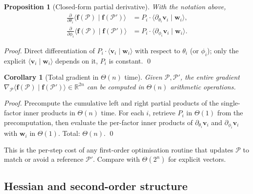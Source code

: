 \documentclass[11pt,letterpaper]{article}
\newtheorem{proposition}[theorem]{Proposition}
\newtheorem{corollary}[theorem]{Corollary}
\theoremstyle{definition}
\newcommand{\R}{\mathbb{R}}
\newcommand{\Polygram}{\mathcal{P}}
\newcommand{\inner}[2]{\langle #1 \mid #2 \rangle}
\begin{document}
\begin{proposition}[Closed-form partial derivative]
\label{prop:partial-derivative}
With the notation above,
\begin{align*}
\frac{\partial}{\partial \theta_{i}} \inner{\bm{f}(\Polygram)}{\bm{f}(\Polygram')}
   &= P_{i} \cdot \inner{\partial_{\theta_{i}} \bm{v}_{i}}{\bm{w}_{i}}, \\
\frac{\partial}{\partial \phi_{i}} \inner{\bm{f}(\Polygram)}{\bm{f}(\Polygram')}
   &= P_{i} \cdot \inner{\partial_{\phi_{i}} \bm{v}_{i}}{\bm{w}_{i}}.
\end{align*}
\end{proposition}

\begin{proof}
Direct differentiation of $P_{i}\cdot \inner{\bm{v}_{i}}{\bm{w}_{i}}$ with
respect to $\theta_{i}$ (or $\phi_{i}$); only the explicit $\inner{\bm{v}_{i}}{
\bm{w}_{i}}$ depends on it, $P_{i}$ is constant. \qed
\end{proof}

\begin{corollary}[Total gradient in $\Theta(n)$ time]
\label{cor:total-gradient}
Given $\Polygram, \Polygram'$, the entire gradient
$\nabla_{\Polygram} \inner{\bm{f}(\Polygram)}{\bm{f}(\Polygram')} \in \R^{2n}$
can be computed in $\Theta(n)$ arithmetic operations.
\end{corollary}
\begin{proof}
Precompute the cumulative left and right partial products of the
single-factor inner products in $\Theta(n)$ time. For each $i$, retrieve
$P_{i}$ in $\Theta(1)$ from the precomputation, then evaluate the per-factor
inner products of $\partial_{\theta_{i}}\bm{v}_{i}$ and $\partial_{\phi_{i}}
\bm{v}_{i}$ with $\bm{w}_{i}$ in $\Theta(1)$. Total: $\Theta(n)$. \qed
\end{proof}

This is the per-step cost of any first-order optimisation routine that updates
$\Polygram$ to match or avoid a reference $\Polygram'$. Compare with
$\Theta(2^{n})$ for explicit vectors.

\subsection{Hessian and second-order structure}
\end{document}
